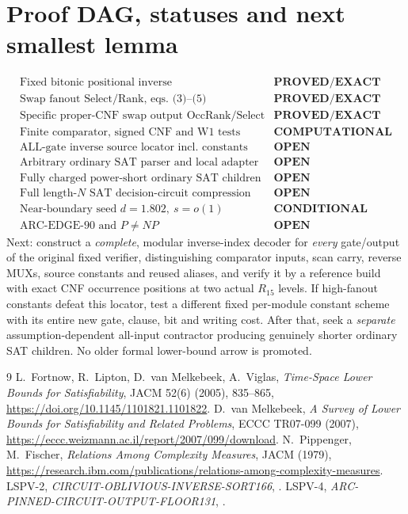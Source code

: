 \documentclass[11pt]{article}
\begin{document}
\section{Proof DAG, statuses and next smallest lemma}
\[
\begin{array}{rl}
\text{Fixed bitonic positional inverse} &\textbf{PROVED/EXACT}\\
\text{Swap fanout Select/Rank, eqs. (3)--(5)} &\textbf{PROVED/EXACT}\\
\text{Specific proper-CNF swap output OccRank/Select} &\textbf{PROVED/EXACT}\\
\text{Finite comparator, signed CNF and W1 tests} &\textbf{COMPUTATIONAL}\\
\text{ALL-gate inverse source locator incl. constants}&\textbf{OPEN}\\
\text{Arbitrary ordinary SAT parser and local adapter}&\textbf{OPEN}\\
\text{Fully charged power-short ordinary SAT children}&\textbf{OPEN}\\
\text{Full length-}N\text{ SAT decision-circuit compression}&\textbf{OPEN}\\
\text{Near-boundary seed }d=1.802,\ s=o(1)&\textbf{CONDITIONAL}\\
\text{ARC-EDGE-90 and }P\ne NP&\textbf{OPEN}
\end{array}
\]
Next: construct a \emph{complete}, modular inverse-index
decoder for \emph{every} gate/output of the original
fixed verifier, distinguishing comparator inputs,
scan carry, reverse MUXs, source constants and reused
aliases, and verify it by a reference build with exact
CNF occurrence positions at two actual $R_{15}$
levels. If high-fanout constants defeat this locator,
test a different fixed per-module constant scheme
with its entire new gate, clause, bit and writing cost.
After that, seek a \emph{separate} assumption-dependent
all-input contractor producing genuinely shorter
ordinary SAT children. No older formal lower-bound
arrow is promoted.

\begin{thebibliography}{9}
 L.~Fortnow, R.~Lipton, D.~van Melkebeek,
A.~Viglas, \emph{Time-Space Lower Bounds for Satisfiability},
JACM 52(6) (2005), 835--865,
\url{https://doi.org/10.1145/1101821.1101822}.
 D.~van Melkebeek,
\emph{A Survey of Lower Bounds for Satisfiability and
Related Problems}, ECCC TR07-099 (2007),
\url{https://eccc.weizmann.ac.il/report/2007/099/download}.
 N.~Pippenger, M.~Fischer,
\emph{Relations Among Complexity Measures}, JACM (1979),
\url{https://research.ibm.com/publications/relations-among-complexity-measures}.
 LSPV-2,
\emph{CIRCUIT-OBLIVIOUS-INVERSE-SORT166},
.
 LSPV-4,
\emph{ARC-PINNED-CIRCUIT-OUTPUT-FLOOR131},
.
\end{thebibliography}
\end{document}
